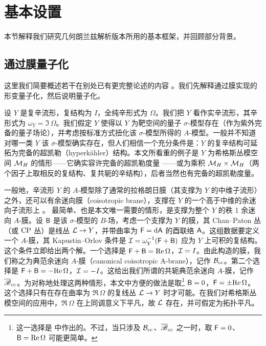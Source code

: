 
\section{基本设置}\label{basic}

本节解释我们研究几何朗兰兹解析版本所用的基本框架，并回顾部分背景。

\subsection{通过膜量子化}\label{background}

这里我们简要概述若干在别处已有更完整论述的内容 \cite{GuW,GW}。我们先解释通过膜实现的形变量子化，然后说明量子化。

设 $Y$ 是复辛流形，复结构为 $I$，全纯辛形式为 $\Omega$。我们把 $Y$ 看作实辛流形，其辛形式为 $\omega_Y=\Im\,\Omega$。我们假定 $Y$ 使得以 $Y$ 为靶空间的量子 $\sigma$-模型存在（作为紫外完备的量子场论），并考虑按标准方式扭化该 $\sigma$-模型所得的 $A$-模型。一般并不知道对哪一类 $Y$ 该 $\sigma$-模型确实存在，但人们相信一个充分条件是：$Y$ 的复辛结构可延拓为完备的超凯勒（hyperkähler）结构。本文所看重的例子是 $Y$ 为希格斯丛模空间 ${\mathcal M}_H$ 的情形——它确实容许完备的超凯勒度量 \cite{H}——或为乘积 ${\mathcal M}_H\times {\mathcal M}_H$（两个因子上取相反的复结构、复共轭的辛结构），后者当然也有完备的超凯勒度量。

一般地，辛流形 $Y$ 的 $A$-模型除了通常的拉格朗日膜（其支撑为 $Y$ 的中维子流形）之外，还可以有余迷向膜（coisotropic brane），支撑在 $Y$ 的一个高于中维的余迷向子流形上 \cite{KO}。 最简单、也是本文唯一需要的情形，是支撑为整个 $Y$ 的秩 1 余迷向 $A$-膜。设 ${\sf B}$ 是该 $\sigma$-模型的 $B$-场，考虑一个支撑为 $Y$ 的膜，其 Chan–Paton 丛（或 ${\mathrm{CP}}$ 丛）是线丛 ${\mathcal L}\to Y$，并带曲率为 ${\sf F}={\mathrm d}{\sf A}$ 的酉联络 ${\sf A}$。这组数据要定义一个 $A$-膜，其 Kapustin–Orlov 条件是 ${\mathcal I}=\omega_Y^{-1}({\sf F}+{\sf B})$ 应为 $Y$ 上可积的复结构。这个条件立即给出两个解。一个选择是 ${\sf F}+{\sf B}={\mathrm{Re}}\,\Omega$，${\mathcal I}=I$。由此构造的膜，我们称之为典范余迷向 $A$-膜（canonical coisotropic A-brane），记作 ${\mathcal B}_{\mathrm{cc}}$。第二个选择是 ${\sf F}+{\sf B}=-{\mathrm{Re}}\,\Omega$，${\mathcal I}=-I$。这给出我们所谓的共轭典范余迷向 $A$-膜，记作 ${\overline {\mathscr B}}_{\mathrm{cc}}$。为对称地处理这两种情形，本文中方便的做法是取\footnote{这一选择是 \cite{GuW} 中作出的。不过，当只涉及 ${\mathcal B}_{\mathrm{cc}}$、${\overline {\mathscr B}}_{\mathrm{cc}}$ 之一时，取 ${\sf F}=0$、${\sf B}={\mathrm{Re}}\,\Omega$ 可能更简单。} ${\sf B}=0$，${\sf F}=\pm {\mathrm{Re}}\,\Omega$。这个选择只有在存在曲率为 $\Re\,\Omega$ 的复线丛 ${\mathcal L}\to Y$ 时才可能。在我们对希格斯丛模空间的应用中，$\Re\,\Omega$ 在上同调意义下平凡，故 ${\mathcal L}$ 存在，并可假定为拓扑平凡。

